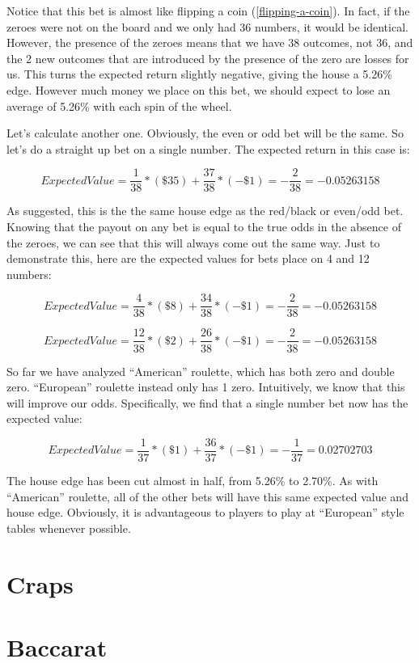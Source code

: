 \documentclass[
]{book}
\begin{document}
Notice that this bet is almost like flipping a coin (\ref{flipping-a-coin}). In fact, if the zeroes were not on the board and we only had 36 numbers, it would be identical. However, the presence of the zeroes means that we have 38 outcomes, not 36, and the 2 new outcomes that are introduced by the presence of the zero are losses for us. This turns the expected return slightly negative, giving the house a 5.26\% edge. However much money we place on this bet, we should expect to lose an average of 5.26\% with each spin of the wheel.

Let's calculate another one. Obviously, the even or odd bet will be the same. So let's do a straight up bet on a single number. The expected return in this case is:

\[ Expected Value = \frac{1}{38} * (\$35) + \frac{37}{38} * (-\$1) = -\frac{2}{38} = -0.05263158 \]

As suggested, this is the the same house edge as the red/black or even/odd bet. Knowing that the payout on any bet is equal to the true odds in the absence of the zeroes, we can see that this will always come out the same way. Just to demonstrate this, here are the expected values for bets place on 4 and 12 numbers:

\[ Expected Value = \frac{4}{38} * (\$8) + \frac{34}{38} * (-\$1) = -\frac{2}{38} = -0.05263158 \]

\[ Expected Value = \frac{12}{38} * (\$2) + \frac{26}{38} * (-\$1) = -\frac{2}{38} = -0.05263158 \]

So far we have analyzed ``American'' roulette, which has both zero and double zero. ``European'' roulette instead only has 1 zero. Intuitively, we know that this will improve our odds. Specifically, we find that a single number bet now has the expected value:

\[ Expected Value = \frac{1}{37} * (\$1) + \frac{36}{37} * (-\$1) = -\frac{1}{37} = 0.02702703 \]

The house edge has been cut almost in half, from 5.26\% to 2.70\%. As with ``American'' roulette, all of the other bets will have this same expected value and house edge. Obviously, it is advantageous to players to play at ``European'' style tables whenever possible.

\hypertarget{craps}{%
\chapter{Craps}\label{craps}}

\hypertarget{baccarat}{%
\chapter{Baccarat}\label{baccarat}}
\end{document}
